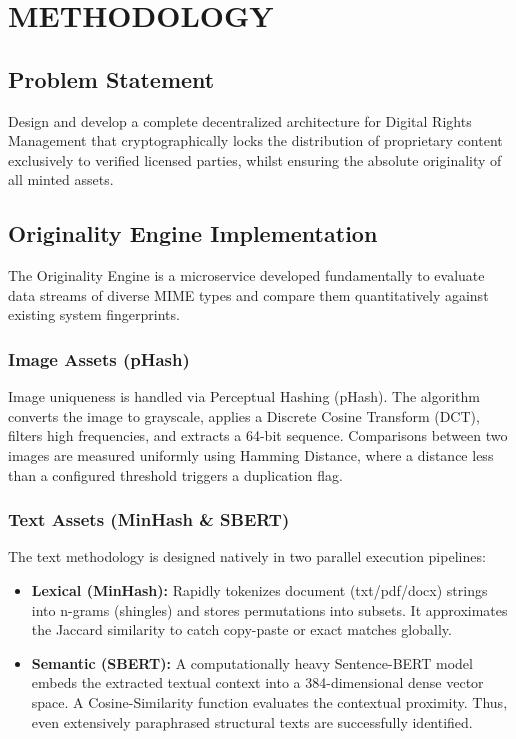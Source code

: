 \documentclass[12pt,a4paper]{report}
\begin{document}
\chapter{METHODOLOGY}

\section{Problem Statement}
Design and develop a complete decentralized architecture for Digital Rights Management that cryptographically locks the distribution of proprietary content exclusively to verified licensed parties, whilst ensuring the absolute originality of all minted assets.

\section{Originality Engine Implementation}
The Originality Engine is a microservice developed fundamentally to evaluate data streams of diverse MIME types and compare them quantitatively against existing system fingerprints.

\subsection{Image Assets (pHash)}
Image uniqueness is handled via Perceptual Hashing (pHash). The algorithm converts the image to grayscale, applies a Discrete Cosine Transform (DCT), filters high frequencies, and extracts a 64-bit sequence. Comparisons between two images are measured uniformly using Hamming Distance, where a distance less than a configured threshold triggers a duplication flag.

\subsection{Text Assets (MinHash \& SBERT)}
The text methodology is designed natively in two parallel execution pipelines:
\begin{itemize}
    \item \textbf{Lexical (MinHash):} Rapidly tokenizes document (txt/pdf/docx) strings into n-grams (shingles) and stores permutations into subsets. It approximates the Jaccard similarity to catch copy-paste or exact matches globally.
    \item \textbf{Semantic (SBERT):} A computationally heavy Sentence-BERT model embeds the extracted textual context into a 384-dimensional dense vector space. A Cosine-Similarity function evaluates the contextual proximity. Thus, even extensively paraphrased structural texts are successfully identified.
\end{itemize}
\end{document}
